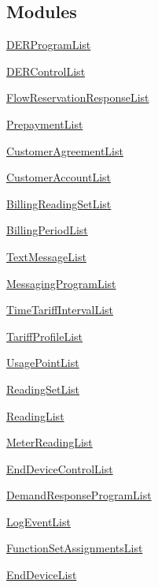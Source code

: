 \subsection*{Modules}
\begin{DoxyCompactItemize}
\item 
\hyperlink{group__DERProgramList}{D\+E\+R\+Program\+List}
\item 
\hyperlink{group__DERControlList}{D\+E\+R\+Control\+List}
\item 
\hyperlink{group__FlowReservationResponseList}{Flow\+Reservation\+Response\+List}
\item 
\hyperlink{group__PrepaymentList}{Prepayment\+List}
\item 
\hyperlink{group__CustomerAgreementList}{Customer\+Agreement\+List}
\item 
\hyperlink{group__CustomerAccountList}{Customer\+Account\+List}
\item 
\hyperlink{group__BillingReadingSetList}{Billing\+Reading\+Set\+List}
\item 
\hyperlink{group__BillingPeriodList}{Billing\+Period\+List}
\item 
\hyperlink{group__TextMessageList}{Text\+Message\+List}
\item 
\hyperlink{group__MessagingProgramList}{Messaging\+Program\+List}
\item 
\hyperlink{group__TimeTariffIntervalList}{Time\+Tariff\+Interval\+List}
\item 
\hyperlink{group__TariffProfileList}{Tariff\+Profile\+List}
\item 
\hyperlink{group__UsagePointList}{Usage\+Point\+List}
\item 
\hyperlink{group__ReadingSetList}{Reading\+Set\+List}
\item 
\hyperlink{group__ReadingList}{Reading\+List}
\item 
\hyperlink{group__MeterReadingList}{Meter\+Reading\+List}
\item 
\hyperlink{group__EndDeviceControlList}{End\+Device\+Control\+List}
\item 
\hyperlink{group__DemandResponseProgramList}{Demand\+Response\+Program\+List}
\item 
\hyperlink{group__LogEventList}{Log\+Event\+List}
\item 
\hyperlink{group__FunctionSetAssignmentsList}{Function\+Set\+Assignments\+List}
\item 
\hyperlink{group__EndDeviceList}{End\+Device\+List}
\end{DoxyCompactItemize}
